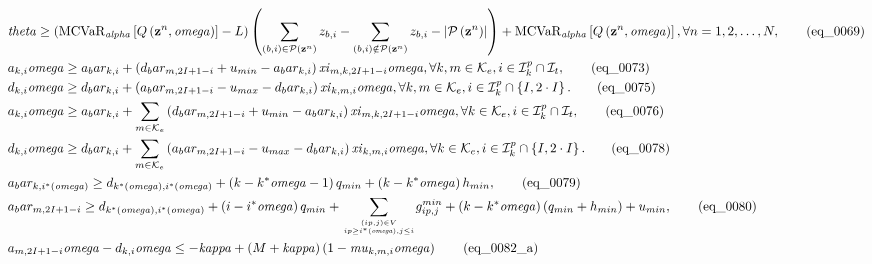 \begin{align}
  & \mathit{theta} \geq \left(\text{MCVaR}_{\mathit{alpha}} \left[Q \left(\mathbf{z}^{n} , \mathit{omega}\right)\right] - L\right) \left(\sum_{\left(b , i\right) \in \mathcal{P} \left(\mathbf{z}^{n}\right)} z_{b , i} - \sum_{\left(b , i\right) \notin \mathcal{P} \left(\mathbf{z}^{n}\right)} z_{b , i} - \left|\mathcal{P} \left(\mathbf{z}^{n}\right)\right|\right) + \text{MCVaR}_{\mathit{alpha}} \left[Q \left(\mathbf{z}^{n} , \mathit{omega}\right)\right] , \forall n = 1 , 2 , \ldots , N , \tag{eq\_0069} \\
  & a_{k , i} \mathit{omega} \geq a_bar_{k , i} + \left(d_bar_{m , 2 I + 1 - i} + u_{min} - a_bar_{k , i}\right) \mathit{xi}_{m , k , 2 I + 1 - i} \mathit{omega} , \forall k , m \in \mathcal{K}_{e} , i \in \mathcal{I}_{k}^{p} \cap \mathcal{I}_{t} , \tag{eq\_0073} \\
  & d_{k , i} \mathit{omega} \geq d_bar_{k , i} + \left(a_bar_{m , 2 I + 1 - i} - u_{max} - d_bar_{k , i}\right) \mathit{xi}_{k , m , i} \mathit{omega} , \forall k , m \in \mathcal{K}_{e} , i \in \mathcal{I}_{k}^{p} \cap \left\{I , 2 \cdot I\right\} . \tag{eq\_0075} \\
  & a_{k , i} \mathit{omega} \geq a_bar_{k , i} + \sum_{m \in \mathcal{K}_{e}} \left(d_bar_{m , 2 I + 1 - i} + u_{min} - a_bar_{k , i}\right) \mathit{xi}_{m , k , 2 I + 1 - i} \mathit{omega} , \forall k \in \mathcal{K}_{e} , i \in \mathcal{I}_{k}^{p} \cap \mathcal{I}_{t} , \tag{eq\_0076} \\
  & d_{k , i} \mathit{omega} \geq d_bar_{k , i} + \sum_{m \in \mathcal{K}_{e}} \left(a_bar_{m , 2 I + 1 - i} - u_{max} - d_bar_{k , i}\right) \mathit{xi}_{k , m , i} \mathit{omega} , \forall k \in \mathcal{K}_{e} , i \in \mathcal{I}_{k}^{p} \cap \left\{I , 2 \cdot I\right\} . \tag{eq\_0078} \\
  & a_bar_{k , i^{*} \left(\mathit{omega}\right)} \geq d_{k^{*} \left(\mathit{omega}\right) , i^{*} \left(\mathit{omega}\right)} + \left(k - k^{*} \mathit{omega} - 1\right) q_{min} + \left(k - k^{*} \mathit{omega}\right) h_{min} , \tag{eq\_0079} \\
  & a_bar_{m , 2 I + 1 - i} \geq d_{k^{*} \left(\mathit{omega}\right) , i^{*} \left(\mathit{omega}\right)} + \left(i - i^{*} \mathit{omega}\right) q_{min} + \underset{\genfrac{}{}{0pt}{}{\left(ip , j\right) \in V}{ip \geq i^{*} \left(\mathit{omega}\right) , j \leq i}}{\sum} g_{ip , j}^{min} + \left(k - k^{*} \mathit{omega}\right) \left(q_{min} + h_{min}\right) + u_{min} , \tag{eq\_0080} \\
  & a_{m , 2 I + 1 - i} \mathit{omega} - d_{k , i} \mathit{omega} \leq - \mathit{kappa} + \left(M + \mathit{kappa}\right) \left(1 - \mathit{mu}_{k , m , i} \mathit{omega}\right) \tag{eq\_0082\_a} \\

\end{align}
